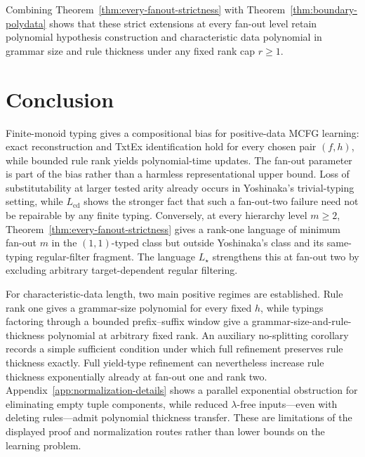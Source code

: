\documentclass[11pt]{article}
\numberwithin{equation}{section}
\theoremstyle{plain}
\theoremstyle{definition}
\theoremstyle{remark}
\begin{document}
Combining Theorem~\ref{thm:every-fanout-strictness} with
Theorem~\ref{thm:boundary-polydata} shows that these strict extensions at every
fan-out level retain polynomial hypothesis construction and characteristic
data polynomial in grammar size and rule thickness under any fixed rank cap
$r\ge1$.


\section{Conclusion}
\label{sec:conclusion}

Finite-monoid typing gives a compositional bias for positive-data MCFG
learning: exact reconstruction and TxtEx identification hold for every chosen
pair $(f,h)$, while bounded rule rank yields polynomial-time updates.  The
fan-out parameter is part of the bias rather than a harmless representational
upper bound.  Loss of substitutability at larger tested arity already occurs
in Yoshinaka's trivial-typing setting, while $L_{\mathrm{cd}}$ shows the
stronger fact that such a fan-out-two failure need not be repairable by any
finite typing.  Conversely, at every hierarchy level $m\ge2$,
Theorem~\ref{thm:every-fanout-strictness} gives a rank-one language of minimum
fan-out $m$ in the $(1,1)$-typed class but outside Yoshinaka's class and its
same-typing regular-filter fragment.  The language $L_\star$ strengthens this
at fan-out two by excluding arbitrary target-dependent regular filtering.

For characteristic-data length, two main positive regimes are established.
Rule rank one gives a grammar-size polynomial for every fixed $h$, while
typings factoring through a bounded prefix--suffix window give a
grammar-size-and-rule-thickness polynomial at arbitrary fixed rank.  An
auxiliary no-splitting corollary records a simple sufficient condition under
which full refinement preserves rule thickness exactly.  Full yield-type
refinement can nevertheless increase rule thickness exponentially already at
fan-out one and rank two.  Appendix~\ref{app:normalization-details} shows a
parallel exponential obstruction for eliminating empty tuple components, while
reduced $\lambda$-free inputs---even with deleting rules---admit polynomial
thickness transfer.  These are limitations of the displayed proof and
normalization routes rather than lower bounds on the learning problem.
\end{document}
